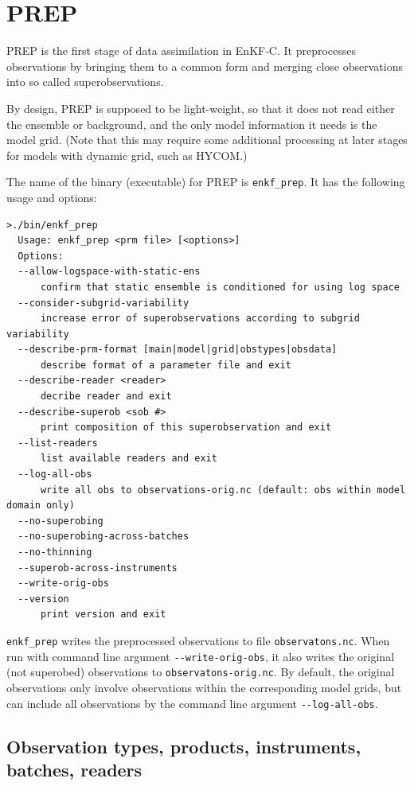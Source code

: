 \documentclass[11pt]{report}
\begin{document}
\section{PREP}

PREP is the first stage of data assimilation in EnKF-C.
It preprocesses observations by bringing them to a common form and merging close observations into so called superobservations.

By design, PREP is supposed to be light-weight, so that it does not read either the ensemble or background, and the only model information it needs is the model grid. 
(Note that this may require some additional processing at later stages for models with dynamic grid, such as HYCOM.)

The name of the binary (executable) for PREP is \verb|enkf_prep|.
It has the following usage and options:
\begin{Verbatim}[frame=single,fontsize=\footnotesize]
>./bin/enkf_prep
  Usage: enkf_prep <prm file> [<options>]
  Options:
  --allow-logspace-with-static-ens
      confirm that static ensemble is conditioned for using log space
  --consider-subgrid-variability
      increase error of superobservations according to subgrid variability
  --describe-prm-format [main|model|grid|obstypes|obsdata]
      describe format of a parameter file and exit
  --describe-reader <reader>
      decribe reader and exit
  --describe-superob <sob #>
      print composition of this superobservation and exit
  --list-readers
      list available readers and exit
  --log-all-obs
      write all obs to observations-orig.nc (default: obs within model domain only)
  --no-superobing
  --no-superobing-across-batches
  --no-thinning
  --superob-across-instruments
  --write-orig-obs
  --version
      print version and exit
\end{Verbatim}

\verb|enkf_prep| writes the preprocessed observations to file \verb|observatons.nc|.
When run with command line argument \verb|--write-orig-obs|, it also writes the original (not superobed) observations to \verb|observatons-orig.nc|.
By default, the original observations only involve observations within the corresponding model grids, but can include all observations by the command line argument \verb|--log-all-obs|.

\subsection{Observation types, products, instruments, batches, readers}
\end{document}
